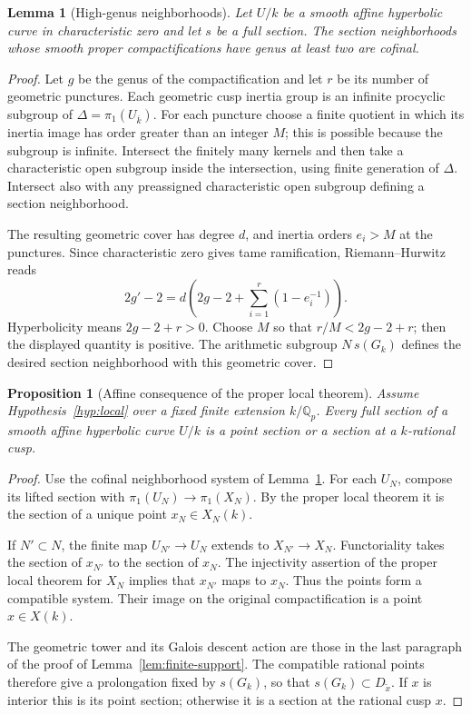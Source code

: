 \documentclass[11pt,a4paper]{article}
\newcommand{\Q}{\mathbb Q}
\newcommand{\kbar}{\overline{k}}
\theoremstyle{plain}
\newtheorem{proposition}[theorem]{Proposition}
\newtheorem{lemma}[theorem]{Lemma}
\theoremstyle{definition}
\begin{document}
\begin{lemma}[High-genus neighborhoods]\label{lem:highgenus}
Let $U/k$ be a smooth affine hyperbolic curve in characteristic zero
and let $s$ be a full section. The section neighborhoods whose smooth
proper compactifications have genus at least two are cofinal.
\end{lemma}
\begin{proof}
Let $g$ be the genus of the compactification and let $r$ be its
number of geometric punctures. Each geometric cusp inertia group
is an infinite procyclic subgroup of $\Delta=\pi_1(U_{\kbar})$.
For each puncture choose a finite quotient in which its inertia
image has order greater than an integer $M$; this is possible
because the subgroup is infinite. Intersect the finitely many
kernels and then take a characteristic open subgroup inside the
intersection, using finite generation of $\Delta$. Intersect also
with any preassigned characteristic open subgroup defining a
section neighborhood.

The resulting geometric cover has degree $d$, and inertia orders
$e_i>M$ at the punctures. Since characteristic zero gives tame
ramification, Riemann--Hurwitz reads
\[
 2g'-2=d\left(2g-2+\sum_{i=1}^r(1-e_i^{-1})\right).
\]
Hyperbolicity means $2g-2+r>0$. Choose $M$ so that
$r/M<2g-2+r$; then the displayed quantity is positive.
The arithmetic subgroup $N\,s(G_k)$ defines the desired section
neighborhood with this geometric cover.
\end{proof}

\begin{proposition}[Affine consequence of the proper local theorem]
\label{prop:local-affine}
Assume Hypothesis~\ref{hyp:local} over a fixed finite extension
$k/\Q_p$. Every full section of a smooth affine hyperbolic curve
$U/k$ is a point section or a section at a $k$-rational cusp.
\end{proposition}
\begin{proof}
Use the cofinal neighborhood system of Lemma~\ref{lem:highgenus}.
For each $U_N$, compose its lifted section with
$\pi_1(U_N)\to\pi_1(X_N)$. By the proper local theorem it is the
section of a unique point $x_N\in X_N(k)$.

If $N'\subset N$, the finite map $U_{N'}\to U_N$ extends to
$X_{N'}\to X_N$. Functoriality takes the section of $x_{N'}$ to
the section of $x_N$. The injectivity assertion of the proper local
theorem for $X_N$ implies that $x_{N'}$ maps to $x_N$. Thus the
points form a compatible system. Their image on the original
compactification is a point $x\in X(k)$.

The geometric tower and its Galois descent action are those in the
last paragraph of the proof of Lemma~\ref{lem:finite-support}.
The compatible rational points therefore give a prolongation
fixed by $s(G_k)$, so that $s(G_k)\subset D_{\widetilde x}$.
If $x$ is interior this is its point section; otherwise it is a
section at the rational cusp $x$.
\end{proof}
\end{document}
